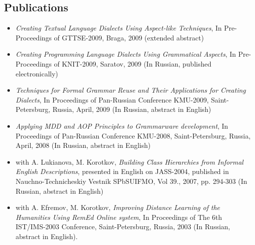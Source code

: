 \documentclass[a4paper, 12pt]{article}
\begin{document}
\subsection*{Publications}
\begin{itemize}
	\item {\it Creating Textual Language Dialects Using Aspect-like Techniques}, In Pre-Proceedings of GTTSE-2009, Braga, 2009 (extended abstract)
	\item {\it Creating Programming Language Dialects Using Grammatical Aspects}, In Pre-Proceedings of KNIT-2009, Saratov, 2009 (In Russian, published electronically)
	\item {\it Techniques for Formal Grammar Reuse and Their Applications for Creating Dialects}, In Proceedings of Pan-Russian Conference KMU-2009, Saint-Petersburg, Russia, April, 2009 (In Russian, abstract in English)
	\item {\it Applying MDD and AOP Principles to Grammarware development}, In Proceedings of Pan-Russian Conference KMU-2008, Saint-Petersburg, Russia, April, 2008 (In Russian, abstract in English)
	\item with A. Lukianova, M. Korotkov, {\it Building Class Hierarchies from Informal English Descriptions}, presented in English on JASS-2004, published in Nauchno-Technicheskiy Vestnik SPbSUIFMO, Vol 39., 2007, pp. 294-303 (In Russian, abstract in English)
	\item with A. Efremov, M. Korotkov, {\it Improving Distance Learning of the Humanities Using {\it RemEd} Online system}, In Proceedings of The 6th IST/IMS-2003 Conference, Saint-Petersburg, Russia, 2003 (In Russian, abstract in English).
\end{itemize}
\end{document}
